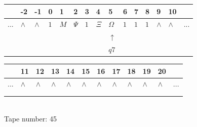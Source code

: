 \documentclass[11pt]{article}
\begin{document}
\begin{table}[H]
\centering
\begin{tabular}{lllllllllllllll}
 & -2 & -1 & 0 & 1 & 2 & 3 & 4 & 5 & 6 & 7 & 8 & 9 & 10 & \\
\hline
$...$ & \multicolumn{1}{|l|}{$\wedge$} & \multicolumn{1}{|l|}{$\wedge$} & \multicolumn{1}{|l|}{$1$} & \multicolumn{1}{|l|}{$M$} & \multicolumn{1}{|l|}{$\Psi$} & \multicolumn{1}{|l|}{$1$} & \multicolumn{1}{|l|}{$\Xi$} & \multicolumn{1}{|l|}{$\Omega$} & \multicolumn{1}{|l|}{$1$} & \multicolumn{1}{|l|}{$1$} & \multicolumn{1}{|l|}{$1$} & \multicolumn{1}{|l|}{$\wedge$} & \multicolumn{1}{|l|}{$\wedge$} & $...$\\
\hline
&  &  &  &  &  &  &  & $\uparrow$ &  &  &  &  &  &  \\
&  &  &  &  &  &  &  & $ q7 $ &  &  &  &  &  &  \\
\end{tabular}
\begin{tabular}{llllllllllll}
 & 11 & 12 & 13 & 14 & 15 & 16 & 17 & 18 & 19 & 20 & \\
\hline
$...$ & \multicolumn{1}{|l|}{$\wedge$} & \multicolumn{1}{|l|}{$\wedge$} & \multicolumn{1}{|l|}{$\wedge$} & \multicolumn{1}{|l|}{$\wedge$} & \multicolumn{1}{|l|}{$\wedge$} & \multicolumn{1}{|l|}{$\wedge$} & \multicolumn{1}{|l|}{$\wedge$} & \multicolumn{1}{|l|}{$\wedge$} & \multicolumn{1}{|l|}{$\wedge$} & \multicolumn{1}{|l|}{$\wedge$} & $...$\\
\hline
&  &  &  &  &  &  &  &  &  &  &  \\
&  &  &  &  &  &  &  &  &  &  &  \\
\end{tabular}
\\
Tape number: 45
\noindent\makebox[\linewidth]{\hdashrule{\textwidth}{1pt}{1pt}}\end{table}
\end{document}
